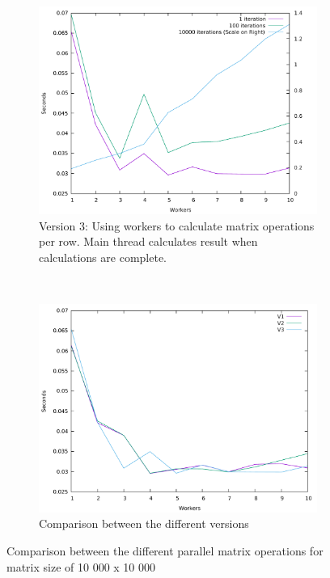 \documentclass[journal]{IEEEtran}
\begin{document}
\begin{figure}[h]
	\\
	\begin{subfigure}{0.48\textwidth}
		\includegraphics[width=\textwidth]{../results/v3}
		\caption{Version 3: Using workers to calculate matrix operations per row. Main thread calculates result when calculations are complete.}
		\label{fig:v3}
	\end{subfigure}
	~
	\begin{subfigure}{0.48\textwidth}
		\includegraphics[width=\textwidth]{../results/cmp}
		\caption{Comparison between the different versions}
		\label{fig:cmp}
	\end{subfigure}
	\caption{Comparison between the different parallel matrix operations for matrix size of 10 000 x 10 000}
\end{figure}
\end{document}
